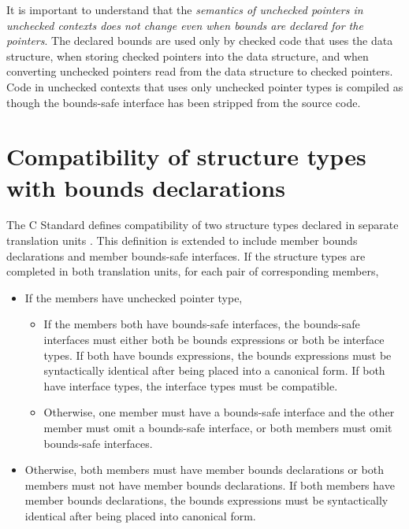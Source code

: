It is important to understand that the \emph{semantics of unchecked
pointers in unchecked contexts does not change even when bounds are declared 
for the pointers}. The declared bounds are used only by checked code that uses the
data structure, when storing checked pointers into the data structure, and when converting
unchecked pointers read from the data structure to checked pointers.  Code in unchecked
contexts that uses only unchecked pointer types is compiled as though the bounds-safe
interface has been stripped from the source code.

\section{Compatibility of structure types with bounds declarations}

The C Standard defines compatibility of two structure types declared in
separate translation units \cite[Section 6.2.7]{ISO2011}.  This definition
is extended to include member bounds declarations and member bounds-safe
interfaces.  If the structure types are completed in both translation
units, for each pair of corresponding members,
\begin{itemize}
\item If the members have unchecked pointer type,
\begin{itemize}
\item If the members both have bounds-safe interfaces, the bounds-safe
interfaces must either both be bounds expressions or both be interface
types. If both have bounds expressions, the bounds expressions must be
syntactically identical after being placed into a canonical form.
If both have interface types, the interface types must be compatible.
\item Otherwise,  one member must have a bounds-safe interface and the
other member must omit a bounds-safe interface, or both members must omit
bounds-safe interfaces.
\end{itemize}
\item Otherwise, both members must have member bounds declarations or both
members must not have member bounds declarations.  If both members have
member bounds declarations, the bounds expressions must be syntactically
identical after being placed into canonical form.
\end{itemize}
